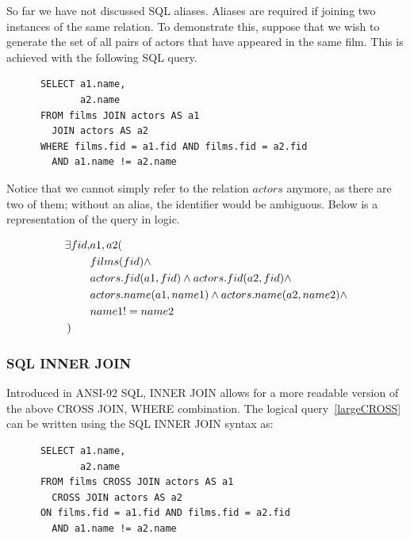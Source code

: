 \documentclass[a4paper, 11pt]{article}
\begin{document}
      So far we have not discussed SQL aliases. Aliases are required if joining
      two instances of the same relation. To demonstrate this, suppose that we
      wish to generate the set of all pairs of actors that have appeared in the
      same film. This is achieved with the following SQL query.

      \begin{verbatim}
      SELECT a1.name,
             a2.name
      FROM films JOIN actors AS a1
        JOIN actors AS a2
      WHERE films.fid = a1.fid AND films.fid = a2.fid 
        AND a1.name != a2.name
      \end{verbatim}

      Notice that we cannot simply refer to the relation $actors$ anymore, as
      there are two of them; without an alias, the identifier would be
      ambiguous. Below is a representation of the query in logic.

      \begin{align}
        \label{largeCROSS}
          \exists fid, & a1, a2(  \nonumber\\
                       & films(fid) \land \nonumber\\
                       & actors.fid(a1, fid) \land actors.fid(a2, fid) \land \nonumber\\
                       & actors.name(a1, name1) \land actors.name(a2, name2) \land \nonumber\\
                       & name1 != name2 \nonumber\\
        ) \hspace{6mm} &  %
      \end{align}


    \subsubsection{SQL INNER JOIN}

      Introduced in ANSI-92 SQL, INNER JOIN allows for a more readable version of
      the above CROSS JOIN, WHERE combination. The logical query~\ref{largeCROSS}
      can be written using the SQL INNER JOIN syntax as:

      \begin{verbatim}
      SELECT a1.name,
             a2.name
      FROM films CROSS JOIN actors AS a1
        CROSS JOIN actors AS a2
      ON films.fid = a1.fid AND films.fid = a2.fid 
        AND a1.name != a2.name
      \end{verbatim}
\end{document}
